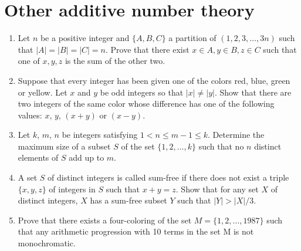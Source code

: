 \documentclass{article}
\begin{document}
\section{Other additive number theory}
\begin{enumerate}
    \item Let $n$ be a positive integer and $\{A, B, C\}$ a partition of $(1, 2,
        3, \ldots, 3n)$ such that $|A| = |B| = |C| = n$. 
        Prove that there exist $x \in A, y \in B, z \in C$ such that one of $x,
        y, z$ is the sum of the other two. 
    \item Suppose that every integer has been given one of the colors 
    red, blue, green or yellow. Let $x$ and $y$ be odd integers so that 
    $|x| \ne |y|$. Show that there are two integers of the same color whose difference
    has one of the following values: $x$, $y$, $(x+y)$ or 
    $(x-y)$.  

    \item Let $k$, $m$, $n$ be integers satisfying $1 < n \le m-1 \le k$. Determine 
    the maximum size of a subset $S$ of the set $\{1, 2, \ldots, k\}$ such that 
    no $n$ distinct elements of $S$ add up to $m$.

    \item A set $S$ of distinct integers is called sum-free if there does not 
    exist a triple $\{x, y, z\}$ of integers in $S$ such that $x + y = z$. Show 
    that for any set $X$ of distinct integers, $X$ has a sum-free subset 
    $Y$ such that $|Y| > |X|/3$.

    \item Prove that there exists a four-coloring of the set $M = \{1,2,\ldots,1987\}$
    such that any arithmetic progression with 10 terms in the set M is not
    monochromatic.
\end{enumerate}
\end{document}
